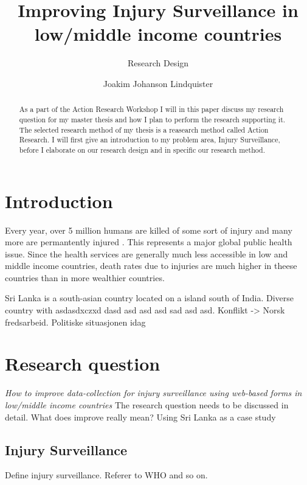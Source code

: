 \documentclass[UKenglish, 12pt]{article}
\title{Improving Injury Surveillance in low/middle income countries}
\subtitle{Research Design}
\author{Joakim Johanson Lindquister}
\begin{document}
\ififorside{}

\begin{abstract}
As a part of the Action Research Workshop I will in this paper discuss my research question for my master thesis and how I plan to perform the research supporting it. The selected research method of my thesis is a reasearch method called Action Research. I will first give an introduction to my problem area, Injury Surveillance, before I elaborate on our research design and in specific our research method.
\end{abstract}

\section*{Introduction} 
Every year, over 5 million humans are killed of some sort of injury and many more are permantently injured \cite[site~12]{who-guide}. This represents a major global public health issue. Since the health services are generally much less accessible in low and middle income countries, death rates due to injuries are much higher in theese countries than in more wealthier countries. 

Sri Lanka is a south-asian country located on a island south of India. Diverse country with asdasdxczxd dasd asd asd asd sad asd asd. Konflikt -> Norsk fredsarbeid. Politiske situasjonen idag


\section*{Research question}
\emph{How to improve data-collection for injury surveillance using web-based forms in low/middle income countries}
The research question needs to be discussed in detail. What does improve really mean? Using Sri Lanka as a case study \\

\subsection*{Injury Surveillance}
Define injury surveillance. Referer to WHO and so on.
\end{document}
